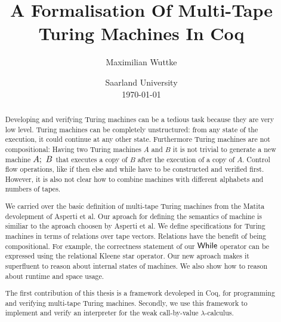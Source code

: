 \documentclass{psartcl}
\begin{document}
\title{A Formalisation Of Multi-Tape \\ Turing Machines In Coq}
\author{Maximilian Wuttke}
\date{Saarland University\\\today}
\maketitle

\begin{abstract}
  Developing and verifying Turing machines can be a tedious task because they are very low level.  Turing machines can be completely unstructured:
  from any state of the execution, it could continue at any other state.  Furthermore Turing machines are not compositional: Having two Turing
  machines $A$ and $B$ it is not trivial to generate a new machine $A ;~ B$ that executes a copy of $B$ after the execution of a copy of $A$.
  Control flow operations, like if then else and while have to be constructed and verified first.  However, it is also not clear how to combine
  machines with different alphabets and numbers of tapes.

  We carried over the basic definition of multi-tape Turing machines from the Matita devolepment of Asperti et al.  Our aproach for defining the
  semantics of machine is similiar to the aproach choosen by Asperti et al.  We define specifications for Turing machines in terms of relations over
  tape vectors.  Relations have the benefit of being compositional.  For example, the correctness statement of our $\textsf{While}$ operator can be
  expressed using the relational Kleene star operator.  Our new aproach makes it superfluent to reason about internal states of machines.  We also
  show how to reason about runtime and space usage.

  The first contribution of this thesis is a framework devoleped in Coq, for programming and verifying multi-tape Turing machines.  Secondly, we use
  this framework to implement and verify an interpreter for the weak call-by-value $\lambda$-calculus.
\end{abstract}
\end{document}

